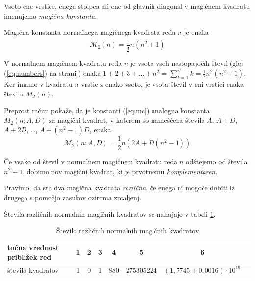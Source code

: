 \documentclass[a4paper,12pt]{article}
\begin{document}
\begin{definicija}
      Vsoto ene vrstice, enega stolpca ali ene od glavnih diagonal
      v magičnem kvadratu imenujemo \emph{magična konstanta}.
\end{definicija}

   Magična konstanta normalnega magičnega kvadrata reda \(n\)
   je enaka
   \begin{equation}
      \label{eq:mc}
      \mathcal{M}_{2}(n) = \frac{1}{2}n(n^{2}+1)
   \end{equation}

\begin{dokaz}

   V normalnem magičnem kvadratu reda \(n\) je vsota vseh nastopajočih
   števil (glej (\ref{eq:numbers}) na strani \pageref{eq:numbers}) enaka
   \(1+2+3+\dots+n^2 = \sum_{k=1}^{n^2} k = \frac{1}{2}n^2(n^2+1)\). Ker imamo
   v kvadratu \(n\) vrstic z enako vsoto, je vsota števil v eni vrstici
   enaka številu \(M_2(n)\). %
\end{dokaz}

Preprost račun pokaže, da je konstanti (\ref{eq:mc}) analogna konstanta
\(M_2(n;A,D)\) za magični kvadrat, v katerem so nameščena števila
\(A\), \(A+D\), \(A+2D\), \ldots, \(A+(n^2-1)D\), enaka %
\[
\mathcal{M}_{2}(n;A,D) = \frac{1}{2}n(2A+D(n^{2}-1))
\]

\begin{definicija}
      Če vsako od števil v normalnem magičnem kvadratu reda \(n\) odštejemo
      od števila \(n^2+1\), dobimo nov magični kvadrat, ki je prvotnemu
      \emph{komplementaren}.
\end{definicija}

\begin{definicija}
      Pravimo, da sta dva magična kvadrata \emph{različna}, če enega ni mogoče dobiti
      iz drugega s pomočjo zasukov oziroma zrcaljenj.
\end{definicija}

Števila različnih normalnih magičnih kvadratov se nahajajo v tabeli \ref{table:stevila}.


\begin{table}[htbp]
    \centering
    \caption{Število različnih normalnih magičnih kvadratov}
    \label{table:stevila}
    \begin{tabular}{|l|*{6}{c|}c|}
        \hline
        točna vrednost približek
        red & 1 & 2 & 3 & 4 & 5 & 6 \\\hline
        število kvadratov & 1 & 0 & 1 & 880 & 275305224 & \((1{,}7745\pm0{,}0016)\cdot 10^{19}\) \\\hline
    \end{tabular}
\end{table}
\end{document}
